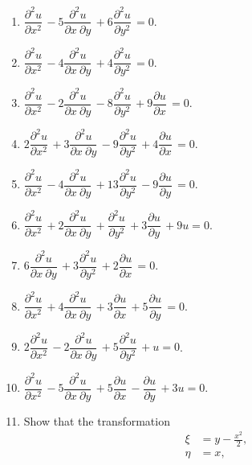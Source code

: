 \documentclass[11pt,a4paper, twoside]{report}
\newcommand{\pf}[2]{\dfrac{\partial #1}{\partial #2}\,}
\newcommand{\pfn}[3]{\dfrac{\partial^#3 #1}{\partial #2^#3}\,}
\newcommand{\pfp}[4]{\dfrac{\partial^#4 #1}{\partial #2\ \partial #3}\,}
\begin{document}
	\begin{enumerate}
		\item $\pfn{u}{x}{2} - 5\pfp{u}{x}{y}{2} + 6\pfn{u}{y}{2} = 0$.
		\item $\pfn{u}{x}{2} - 4\pfp{u}{x}{y}{2} + 4\pfn{u}{y}{2} = 0$.
		\item $\pfn{u}{x}{2} - 2\pfp{u}{x}{y}{2} - 8\pfn{u}{y}{2} + 9\pf{u}{x} =0$.
		\item $2\pfn{u}{x}{2} + 3\pfp{u}{x}{y}{2} - 9\pfn{u}{y}{2} + 4\pf{u}{x} = 0$.
		\item $\pfn{u}{x}{2} - 4\pfp{u}{x}{y}{2} + 13\pfn{u}{y}{2} - 9\pf{u}{y} = 0$.
		\item $\pfn{u}{x}{2} + 2\pfp{u}{x}{y}{2} + \pfn{u}{y}{2} + 3\pf{u}{y} + 9u = 0$.
		\item $6\pfp{u}{x}{y}{2} + 3\pfn{u}{y}{2} + 2\pf{u}{x} = 0$.
		\item $\pfn{u}{x}{2} + 4\pfp{u}{x}{y}{2} + 3\pf{u}{x} + 5\pf{u}{y} = 0$.
		\item $2\pfn{u}{x}{2} - 2\pfp{u}{x}{y}{2} + 5\pfn{u}{y}{2} + u = 0$.
		\item $\pfn{u}{x}{2} - 5\pfp{u}{x}{y}{2} + 5\pf{u}{x} -\pf{u}{y} + 3u = 0$.
		\item Show that the transformation
					\begin{align*}
						\xi &= y - \frac{x^2}{2},\\
						\eta &= x,
					\end{align*}
	\end{enumerate}
\end{document}
